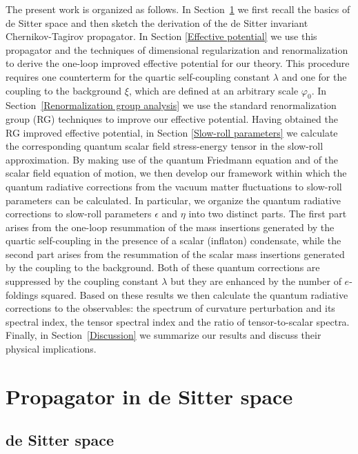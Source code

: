 The present work is organized as follows. In
Section~\ref{Propagator in de Sitter space} we first recall the
basics of de Sitter space and then sketch the derivation of the de
Sitter invariant Chernikov-Tagirov propagator. In Section
\ref{Effective potential} we use this propagator and the
techniques of dimensional regularization and renormalization to
derive the one-loop improved effective potential for our theory.
This procedure requires one counterterm for the quartic
self-coupling constant $\lambda$ and one for the coupling to the
background $\xi$, which are defined at an arbitrary scale
$\varphi_0$. In Section~\ref{Renormalization group analysis} we
use the standard renormalization group (RG) techniques to improve
our effective potential. 
Having obtained the RG improved effective
potential, in Section \ref{Slow-roll parameters} we calculate the
corresponding quantum scalar field stress-energy tensor in the slow-roll
approximation. By making use of the quantum Friedmann equation and
of the scalar field equation of motion, we then develop our
framework within which the quantum radiative corrections from the
vacuum matter fluctuations to slow-roll parameters can be
calculated. In particular, we organize the quantum radiative
corrections to slow-roll parameters $\epsilon$ and $\eta$ into two
distinct parts. The first part arises from the one-loop
resummation of the mass insertions generated by the quartic
self-coupling in the presence of a scalar (inflaton) condensate,
while the second part arises from the resummation of the scalar mass
insertions generated by the coupling to the background. Both of
these quantum corrections are suppressed by the coupling constant
$\lambda$ but they are enhanced by the number of $e$-foldings squared.
Based on these results we then calculate the quantum radiative
corrections to the observables: the spectrum of curvature
perturbation and its spectral index, the tensor spectral index and
the ratio of tensor-to-scalar spectra. Finally, in
Section~\ref{Discussion} we summarize our results and discuss
their physical implications.

\section{Propagator in de Sitter space}
\label{Propagator in de Sitter space}

\subsection{de Sitter space}
\label{de Sitter space}

